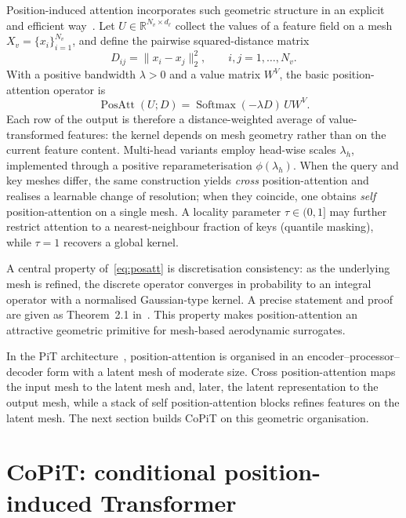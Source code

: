 \documentclass[final,3p,times]{elsarticle}
\begin{document}
Position-induced attention incorporates such geometric structure in an explicit and efficient way~\cite{chen2024pit}. Let $U\in\mathbb{R}^{N_{v}\times d_{\ell}}$ collect the values of a feature field on a mesh $X_{v}=\{x_{i}\}_{i=1}^{N_{v}}$, and define the pairwise squared-distance matrix
\begin{equation}
  D_{ij}
  =
  \|x_{i}-x_{j}\|_{2}^{2},
  \qquad
  i,j=1,\ldots,N_{v}.
  \label{eq:dist_mat}
\end{equation}
With a positive bandwidth $\lambda>0$ and a value matrix $W^{V}$, the basic position-attention operator is
\begin{equation}
  \operatorname{PosAtt}(U;D)
  =
  \operatorname{Softmax}(-\lambda D)\,
  U W^{V}.
  \label{eq:posatt}
\end{equation}
Each row of the output is therefore a distance-weighted average of value-transformed features: the kernel depends on mesh geometry rather than on the current feature content. Multi-head variants employ head-wise scales $\lambda_{h}$, implemented through a positive reparameterisation $\phi(\lambda_{h})$. When the query and key meshes differ, the same construction yields \emph{cross} position-attention and realises a learnable change of resolution; when they coincide, one obtains \emph{self} position-attention on a single mesh. A locality parameter $\tau\in(0,1]$ may further restrict attention to a nearest-neighbour fraction of keys (quantile masking), while $\tau=1$ recovers a global kernel.

A central property of~\eqref{eq:posatt} is discretisation consistency: as the underlying mesh is refined, the discrete operator converges in probability to an integral operator with a normalised Gaussian-type kernel. A precise statement and proof are given as Theorem~2.1 in~\cite{chen2024pit}. This property makes position-attention an attractive geometric primitive for mesh-based aerodynamic surrogates.

In the PiT architecture~\cite{chen2024pit}, position-attention is organised in an encoder--processor--decoder form with a latent mesh of moderate size. Cross position-attention maps the input mesh to the latent mesh and, later, the latent representation to the output mesh, while a stack of self position-attention blocks refines features on the latent mesh. The next section builds CoPiT on this geometric organisation.


\section{CoPiT: conditional position-induced Transformer}
\label{sec:method}
\end{document}
